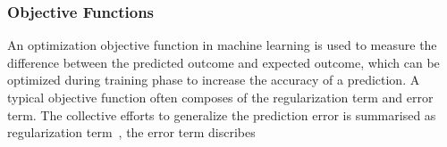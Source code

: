\subsubsection{Objective Functions}
An optimization objective function in machine learning is used to measure the difference between the predicted outcome and expected outcome, which can be optimized during training phase to increase the accuracy of a prediction. A typical objective function often composes of the regularization term and error term. The collective efforts to generalize the prediction error is summarised as regularization term~\cite{goodfellow_2015}, the error term discribes  
